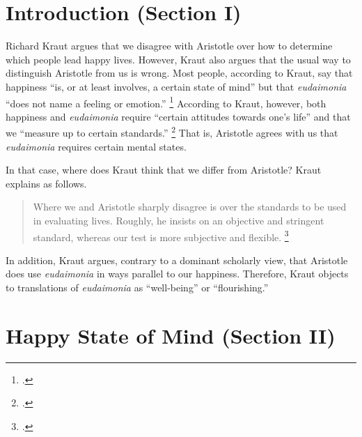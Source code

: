 \documentclass[12pt,letterpaper]{article}
\begin{document}
\raggedright


\pagestyle{notes}

\section*{Introduction (Section I)}

Richard Kraut argues that we disagree with Aristotle over how to determine which people lead happy lives.
However, Kraut also argues that the usual way to distinguish Aristotle from us is wrong.
Most people, according to Kraut, say that happiness ``is, or at least involves, a certain state of mind'' but that \textit{eudaimonia} ``does not name a feeling or emotion.''%
\footcite[][167]{two-conceptions-of-happiness-kraut-1979}
According to Kraut, however, both happiness and \textit{eudaimonia} require ``certain attitudes towards one's life'' and that we ``measure up to certain standards.''%
\footcite[][197]{two-conceptions-of-happiness-kraut-1979}
That is, Aristotle agrees with us that \textit{eudaimonia} requires certain mental states.

In that case, where does Kraut think that we differ from Aristotle? Kraut explains as follows.

\begin{quote}
    Where we and Aristotle sharply disagree is over the standards to be used in evaluating lives.
    Roughly, he insists on an objective and stringent standard, whereas our test is more subjective and flexible.%
    \footcite[][197]{two-conceptions-of-happiness-kraut-1979}
\end{quote}

In addition, Kraut argues, contrary to a dominant scholarly view, that Aristotle does use \textit{eudaimonia} in ways parallel to our happiness.
Therefore, Kraut objects to translations of \textit{eudaimonia} as ``well-being'' or ``flourishing.''

\section*{Happy State of Mind (Section II)}
\end{document}
